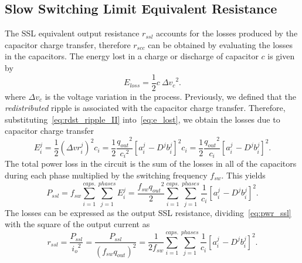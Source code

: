 
\subsection[SSL Equivalent Resistance ]{Slow Switching Limit Equivalent Resistance}

The SSL equivalent output resistance $r_{ssl}$ accounts for the losses produced by the capacitor charge transfer, therefore $r_{scc}$ can be obtained by evaluating the losses in the capacitors.  The energy lost in a charge or discharge of capacitor $c$ is given by
\begin{equation}
E_{loss}=\frac{1}{2} c ~{\Delta{v}_c}^2 .
\label{eq:e_lost}
\end{equation}
where $\Delta v_c$ is the voltage variation in the process. Previously, we defined that the \emph{redistributed} ripple is associated with the capacitor charge transfer. Therefore, substituting~\eqref{eq:rdst_ripple_II} into~\eqref{eq:e_lost}, we obtain the losses due to capacitor charge transfer
\begin{equation}
E_i^j=\frac{1}{2}{({\Delta{vr}}_i^j)}^2 c_i = \frac{1}{2}\frac{{q_{out}}^2}{{c_i}^2}{\left[a_{i\
}^j-{D^j} {b_i^j}\right]}^2c_i=\frac{1}{2}\frac{{q_{out}}^2}{c_i}{\left[a_{i\
}^j-{D^j} {b_i^j}\right]}^2 .
\label{eq:e_lost_ssl}
\end{equation}
The total power loss in the circuit is the sum of the losses in all of the capacitors during each phase multiplied by the switching frequency $f_{sw}$. This yield{\small s}
\begin{equation}
P_{ssl}= f_{sw} \sum_{i=1}^{caps.}\sum_{j=1}^{phases} E_i^j =\frac{f_{sw}{q_{out}}^2}{2}\sum_{i=1}^{caps.}\sum_{j=1}^{phases}\frac{1}{c_i}{\left[a_{i\
}^j-{D^j}{b_i^j}\right]}^2.
\label{eq:pwr_ssl}
\end{equation}
The losses can be expressed as the output SSL resistance, dividing~\eqref{eq:pwr_ssl} with the
square of the output current as
\begin{equation}
r_{ssl}=\frac{P_{ssl}}{{i_o}^2}=\frac{P_{ssl}}{{(f_{sw} {q_{out}})}^2}=\frac{1}{2 f_{sw}}\sum_{i=1}^{caps.}\sum_{j=1}^{phases}\frac{1}{c_i}{\left[a_{i\
}^j-{D^j} {b_i^j}\right]}^2.
\label{eq:r_ssl}
\end{equation}


